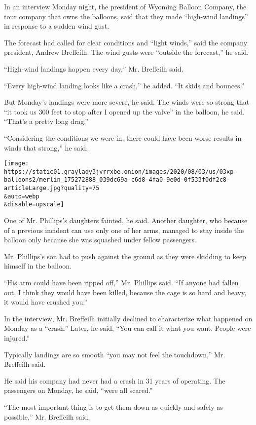 In an interview Monday night, the president of Wyoming Balloon Company,
the tour company that owns the balloons, said that they made ``high-wind
landings'' in response to a sudden wind gust.

The forecast had called for clear conditions and ``light winds,'' said
the company president, Andrew Breffeilh. The wind gusts were ``outside
the forecast,'' he said.

``High-wind landings happen every day,'' Mr. Breffeilh said.

``Every high-wind landing looks like a crash,'' he added. ``It skids and
bounces.''

But Monday's landings were more severe, he said. The winds were so
strong that ``it took us 300 feet to stop after I opened up the valve''
in the balloon, he said. ``That's a pretty long drag.''

``Considering the conditions we were in, there could have been worse
results in winds that strong,'' he said.

\texttt{[image: https://static01.graylady3jvrrxbe.onion/images/2020/08/03/us/03xp-balloons2/merlin\_175272888\_039dc69a-c6d8-4fa0-9e0d-0f533f0df2c8-articleLarge.jpg?quality=75\\\&auto=webp\\\&disable=upscale]}

One of Mr. Phillips's daughters fainted, he said. Another daughter, who
because of a previous incident can use only one of her arms, managed to
stay inside the balloon only because she was squashed under fellow
passengers.

Mr. Phillips's son had to push against the ground as they were skidding
to keep himself in the balloon.

``His arm could have been ripped off,'' Mr. Phillips said. ``If anyone
had fallen out, I think they would have been killed, because the cage is
so hard and heavy, it would have crushed you.''

In the interview, Mr. Breffeilh initially declined to characterize what
happened on Monday as a ``crash.'' Later, he said, ``You can call it
what you want. People were injured.''

Typically landings are so smooth ``you may not feel the touchdown,'' Mr.
Breffeilh said.

He said his company had never had a crash in 31 years of operating. The
passengers on Monday, he said, ``were all scared.''

``The most important thing is to get them down as quickly and safely as
possible,'' Mr. Breffeilh said.


